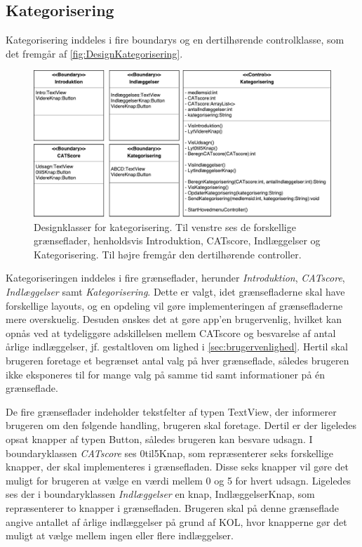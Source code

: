 \subsection*{Kategorisering}
Kategorisering inddeles i fire boundarys og en dertilhørende controlklasse, som det fremgår af \autoref{fig:DesignKategorisering}.

\begin{figure} [H]
\centering
\includegraphics[width=1\textwidth]{figures/MVC/MVCKategorisering}
\caption{Designklasser for kategorisering. Til venstre ses de forskellige grænseflader, henholdsvis Introduktion, CATscore, Indlæggelser og Kategorisering. Til højre fremgår den dertilhørende controller.}
\label{fig:DesignKategorisering}
\end{figure}

\noindent
Kategoriseringen inddeles i fire grænseflader, herunder \textit{Introduktion}, \textit{CATscore}, \textit{Indlæggelser} samt \textit{Kategorisering}. Dette er valgt, idet grænsefladerne skal have forskellige layouts, og en opdeling vil gøre implementeringen af grænsefladerne mere overskuelig. Desuden ønskes det at gøre app’en brugervenlig, hvilket kan opnås ved at tydeliggøre adskillelsen mellem CATscore og besvarelse af antal årlige indlæggelser, jf. gestaltloven om lighed i \autoref{sec:brugervenlighed}. Hertil skal brugeren foretage et begrænset antal valg på hver grænseflade, således
brugeren ikke eksponeres til for mange valg på samme tid samt informationer på én grænseflade.

De fire grænseflader indeholder tekstfelter af typen TextView, der informerer brugeren om den følgende handling, brugeren skal foretage. Dertil er der ligeledes opsat knapper af typen Button, således brugeren kan besvare udsagn. I boundaryklassen \textit{CATscore} ses 0til5Knap, som repræsenterer seks forskellige knapper, der skal implementeres i grænsefladen. Disse seks knapper vil gøre det muligt for brugeren at vælge en værdi mellem 0 og 5 for hvert udsagn. Ligeledes ses der i boundaryklassen \textit{Indlæggelser} en knap, IndlæggelserKnap, som repræsenterer to knapper i grænsefladen. Brugeren skal på denne grænseflade angive antallet af årlige indlæggelser på grund af KOL, hvor knapperne gør det muligt at vælge mellem ingen eller flere indlæggelser.

